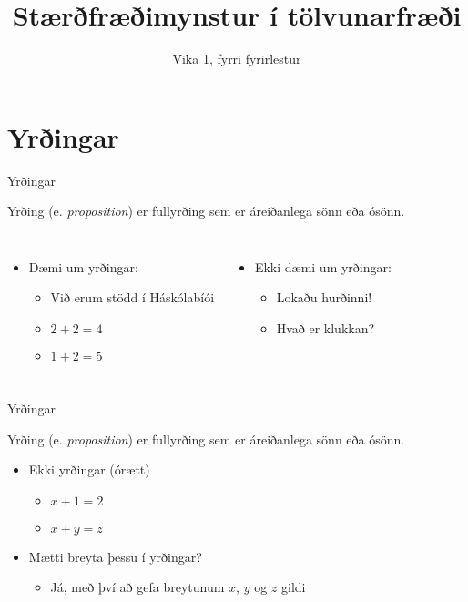 \documentclass[handout]{beamer}
\title{Stærðfræðimynstur í tölvunarfræði}
\subtitle{Vika 1, fyrri fyrirlestur}
\begin{document}
\begin{frame}
\titlepage
\end{frame}

\section{Yrðingar}

\begin{frame}{Yrðingar}
\begin{tcolorbox}[title=Yrðing]
Yrðing (e. \emph{proposition}) er fullyrðing sem er áreiðanlega sönn eða ósönn.
\end{tcolorbox}
\begin{columns}
\begin{itemize}
 \item Dæmi um yrðingar:
 \begin{itemize}
  \item Við erum stödd í Háskólabíói
  \item $2 + 2 = 4$
  \item $1 + 2 = 5$
 \end{itemize}
\end{itemize}
\begin{itemize}
 \item Ekki dæmi um yrðingar:
 \begin{itemize}
  \item Lokaðu hurðinni!
  \item Hvað er klukkan?
 \end{itemize}
\end{itemize}
\end{columns}
\end{frame}

\begin{frame}{Yrðingar}
\begin{tcolorbox}[title=Yrðing]
Yrðing (e. \emph{proposition}) er fullyrðing sem er áreiðanlega sönn eða ósönn.
\end{tcolorbox}
\begin{itemize}
 \item Ekki yrðingar (órætt)
 \begin{itemize}
  \item $x + 1 = 2$
  \item $x + y = z$
 \end{itemize} \pause
 \item Mætti breyta þessu í yrðingar?\pause
 \begin{itemize}
  \item Já, með því að gefa breytunum $x$, $y$ og $z$ gildi
 \end{itemize}
\end{itemize}
\end{frame}
\end{document}

